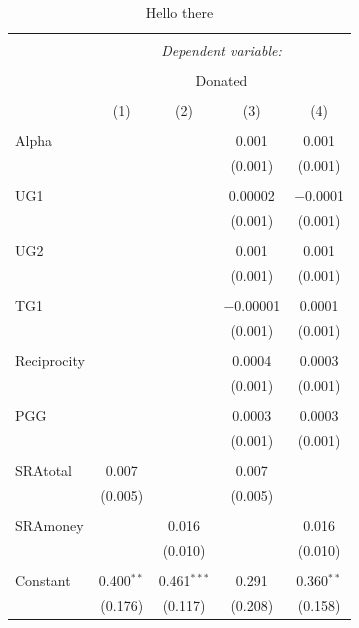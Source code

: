 \documentclass[12pt]{article}
\begin{document}
\begin{table}[!htbp]
 \centering 
  \caption{Hello there} 
  \label{TestTable} 
          \begin{adjustbox}{width=\textwidth}
\begin{tabular}{@{\extracolsep{5pt}}lcccc} 
\\[-1.8ex]\hline 
\hline \\[-1.8ex] 
 & \multicolumn{4}{c}{\textit{Dependent variable:}} \\ 
\cline{2-5} 
\\[-1.8ex] & \multicolumn{4}{c}{Donated} \\ 
\\[-1.8ex] & (1) & (2) & (3) & (4)\\ 
\hline \\[-1.8ex] 
 Alpha &  &  & 0.001 & 0.001 \\ 
  &  &  & (0.001) & (0.001) \\ 
  & & & & \\ 
 UG1 &  &  & 0.00002 & $-$0.0001 \\ 
  &  &  & (0.001) & (0.001) \\ 
  & & & & \\ 
 UG2 &  &  & 0.001 & 0.001 \\ 
  &  &  & (0.001) & (0.001) \\ 
  & & & & \\ 
 TG1 &  &  & $-$0.00001 & 0.0001 \\ 
  &  &  & (0.001) & (0.001) \\ 
  & & & & \\ 
 Reciprocity &  &  & 0.0004 & 0.0003 \\ 
  &  &  & (0.001) & (0.001) \\ 
  & & & & \\ 
 PGG &  &  & 0.0003 & 0.0003 \\ 
  &  &  & (0.001) & (0.001) \\ 
  & & & & \\ 
 SRAtotal & 0.007 &  & 0.007 &  \\ 
  & (0.005) &  & (0.005) &  \\ 
  & & & & \\ 
 SRAmoney &  & 0.016 &  & 0.016 \\ 
  &  & (0.010) &  & (0.010) \\ 
  & & & & \\ 
 Constant & 0.400$^{**}$ & 0.461$^{***}$ & 0.291 & 0.360$^{**}$ \\ 
  & (0.176) & (0.117) & (0.208) & (0.158) \\ 

\end{tabular}
\end{adjustbox}
\end{table}
\end{document}
